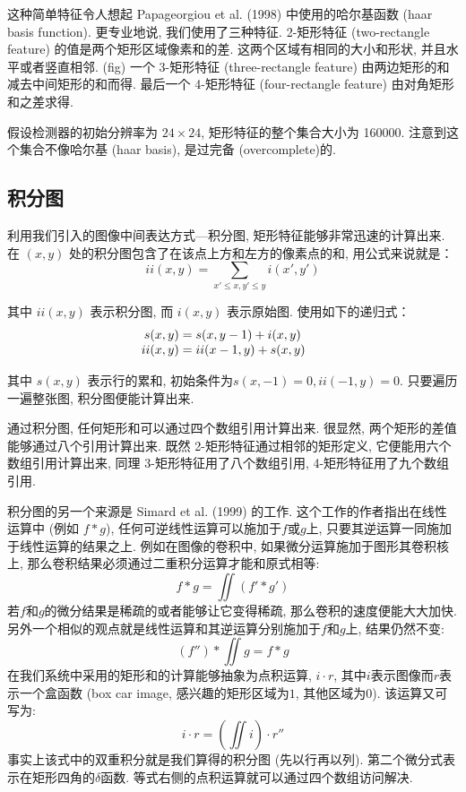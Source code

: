 \documentclass[utf8]{ctexart}
\begin{document}
这种简单特征令人想起 Papageorgiou et al. (1998) 中使用的哈尔基函数 (haar basis function). 更专业地说, 我们使用了三种特征. 2-矩形特征 (two-rectangle feature) 的值是两个矩形区域像素和的差. 这两个区域有相同的大小和形状, 并且水平或者竖直相邻. (fig)
一个 3-矩形特征 (three-rectangle feature) 由两边矩形的和减去中间矩形的和而得. 最后一个 4-矩形特征 (four-rectangle feature) 由对角矩形和之差求得. 

假设检测器的初始分辨率为 $24\times24$, 矩形特征的整个集合大小为 160000. 注意到这个集合不像哈尔基 (haar basis), 是过完备 (overcomplete)的.

\subsection{积分图}

利用我们引入的图像中间表达方式---积分图, 矩形特征能够非常迅速的计算出来. 在 $(x, y)$ 处的积分图包含了在该点上方和左方的像素点的和, 用公式来说就是：
\[
    ii(x, y)= \sum_{x'\leq x, y'\leq y} i(x', y')
\]

其中 $ii(x, y)$ 表示积分图, 而 $i(x, y)$ 表示原始图. 使用如下的递归式：
\[
    \begin{array}{r@{}>{{}}l@{\qquad}r@{}>{{}}l}
        s(x,y)&=s(x,y-1)+i(x,y)\\
        ii(x,y)&=ii(x-1,y)+s(x,y)
    \end{array}
\]

其中 $s(x, y)$ 表示行的累和, 初始条件为$s(x,-1)=0, ii(-1,y)=0$. 只要遍历一遍整张图, 积分图便能计算出来. 

通过积分图, 任何矩形和可以通过四个数组引用计算出来. 很显然, 两个矩形的差值能够通过八个引用计算出来. 既然 2-矩形特征通过相邻的矩形定义, 它便能用六个数组引用计算出来, 同理 3-矩形特征用了八个数组引用, 4-矩形特征用了九个数组引用.

积分图的另一个来源是 Simard et al. (1999) 的工作. 这个工作的作者指出在线性运算中 (例如 $f\ast g$), 任何可逆线性运算可以施加于$f$或$g$上, 只要其逆运算一同施加于线性运算的结果之上. 例如在图像的卷积中, 如果微分运算施加于图形其卷积核上, 那么卷积结果必须通过二重积分运算才能和原式相等:
\[
    f\ast g = \iint(f'\ast g')
\]
若$f$和$g$的微分结果是稀疏的或者能够让它变得稀疏, 那么卷积的速度便能大大加快. 另外一个相似的观点就是线性运算和其逆运算分别施加于$f$和$g$上, 结果仍然不变:
\[
    (f'')\ast\iint g = f\ast g
\]
在我们系统中采用的矩形和的计算能够抽象为点积运算, $i\cdot r$, 其中$i$表示图像而$r$表示一个盒函数 (box car image, 感兴趣的矩形区域为$1$, 其他区域为$0$). 该运算又可写为:
\[
    i\cdot r = (\iint i)\cdot r''
\]
事实上该式中的双重积分就是我们算得的积分图 (先以行再以列). 第二个微分式表示在矩形四角的$\delta$函数. 等式右侧的点积运算就可以通过四个数组访问解决.
\end{document}
